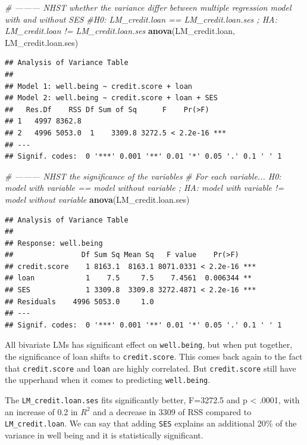 \documentclass[]{article}
\newenvironment{Shaded}{\begin{snugshade}}{\end{snugshade}}
\newcommand{\CommentTok}[1]{\textcolor[rgb]{0.56,0.35,0.01}{\textit{#1}}}
\newcommand{\KeywordTok}[1]{\textcolor[rgb]{0.13,0.29,0.53}{\textbf{#1}}}
\newcommand{\NormalTok}[1]{#1}
\begin{document}
\begin{Shaded}
\begin{Highlighting}[]
\CommentTok{# --------- NHST whether the variance differ between multiple regression model with and without SES}
\CommentTok{#H0: LM_credit.loan == LM_credit.loan.ses ; HA: LM_credit.loan != LM_credit.loan.ses }
\KeywordTok{anova}\NormalTok{(LM_credit.loan, LM_credit.loan.ses) }
\end{Highlighting}
\end{Shaded}

\begin{verbatim}
## Analysis of Variance Table
## 
## Model 1: well.being ~ credit.score + loan
## Model 2: well.being ~ credit.score + loan + SES
##   Res.Df    RSS Df Sum of Sq      F    Pr(>F)    
## 1   4997 8362.8                                  
## 2   4996 5053.0  1    3309.8 3272.5 < 2.2e-16 ***
## ---
## Signif. codes:  0 '***' 0.001 '**' 0.01 '*' 0.05 '.' 0.1 ' ' 1
\end{verbatim}

\begin{Shaded}
\begin{Highlighting}[]
\CommentTok{# --------- NHST the significance of the variables}
\CommentTok{# For each variable... H0: model with variable == model without variable ; HA: model with variable != model without variable}
\KeywordTok{anova}\NormalTok{(LM_credit.loan.ses) }
\end{Highlighting}
\end{Shaded}

\begin{verbatim}
## Analysis of Variance Table
## 
## Response: well.being
##                Df Sum Sq Mean Sq   F value    Pr(>F)    
## credit.score    1 8163.1  8163.1 8071.0331 < 2.2e-16 ***
## loan            1    7.5     7.5    7.4561  0.006344 ** 
## SES             1 3309.8  3309.8 3272.4871 < 2.2e-16 ***
## Residuals    4996 5053.0     1.0                        
## ---
## Signif. codes:  0 '***' 0.001 '**' 0.01 '*' 0.05 '.' 0.1 ' ' 1
\end{verbatim}

All bivariate LMs has significant effect on \texttt{well.being}, but
when put together, the significance of loan shifts to
\texttt{credit.score}. This comes back again to the fact that
\texttt{credit.score} and \texttt{loan} are highly correlated. But
\texttt{credit.score} still have the upperhand when it comes to
predicting \texttt{well.being}.

The \texttt{LM\_credit.loan.ses} fits significantly better, F=3272.5 and
p \textless{} .0001, with an increase of 0.2 in \(R^2\) and a decrease
in 3309 of RSS compared to \texttt{LM\_credit.loan}. We can say that
adding \texttt{SES} explains an additional 20\% of the variance in well
being and it is statistically significant.
\end{document}
